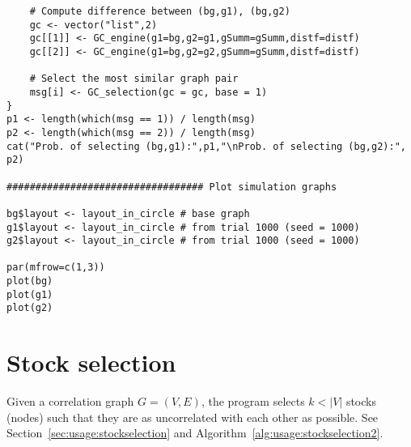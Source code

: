 {\begin{lstlisting}
	# Compute difference between (bg,g1), (bg,g2)
	gc <- vector("list",2)
	gc[[1]] <- GC_engine(g1=bg,g2=g1,gSumm=gSumm,distf=distf)
	gc[[2]] <- GC_engine(g1=bg,g2=g2,gSumm=gSumm,distf=distf)
	
	# Select the most similar graph pair
	msg[i] <- GC_selection(gc = gc, base = 1)
}
p1 <- length(which(msg == 1)) / length(msg)
p2 <- length(which(msg == 2)) / length(msg)
cat("Prob. of selecting (bg,g1):",p1,"\nProb. of selecting (bg,g2):", p2)

################################## Plot simulation graphs

bg$layout <- layout_in_circle # base graph
g1$layout <- layout_in_circle # from trial 1000 (seed = 1000)
g2$layout <- layout_in_circle # from trial 1000 (seed = 1000)

par(mfrow=c(1,3))
plot(bg)
plot(g1)
plot(g2)
\end{lstlisting}
}




















\section{Stock selection}
\label{sec:appendicies:usage:stockselection}

Given a correlation graph $G=(V,E)$, the program selects $k < |V|$ stocks 
(nodes) 
such that they are as uncorrelated with each other as possible. 
See Section~\ref{sec:usage:stockselection} and 
Algorithm~\ref{alg:usage:stockselection2}.

